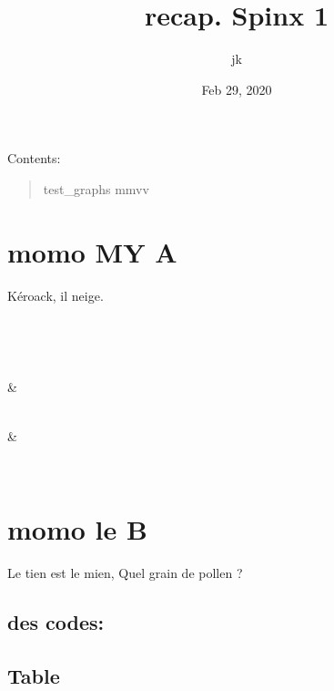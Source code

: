 \documentclass[letterpaper,10pt,english]{sphinxmanual}
\title{recap.\@{} Spinx 1}
\date{Feb 29, 2020}
\author{jk}
\begin{document}
\pagestyle{empty}
\sphinxmaketitle
\pagestyle{plain}
\sphinxtableofcontents
\pagestyle{normal}
\label{\detokenize{index::doc}}


Contents:
\begin{quote}

test\_graphs mmvv
\end{quote}


\chapter{momo MY A}
\label{\detokenize{a:momo-my-a}}\label{\detokenize{a:lien-sur-a}}\label{\detokenize{a::doc}}
Kéroack, il neige.


\begin{savenotes}\sphinxatlongtablestart\begin{longtable}[c]{}
\hline

\endfirsthead

%
{}\\
\hline

\endhead

\hline
{}\\
\endfoot

\endlastfoot

&

\\
\hline
{}
&

\\
\hline
\end{longtable}\sphinxatlongtableend\end{savenotes}


\chapter{momo le B}
\label{\detokenize{b:momo-le-b}}\label{\detokenize{b::doc}}
Le tien est le mien, Quel grain de pollen ?


\section{des codes:}
\label{\detokenize{b:des-codes}}

\section{Table}
\label{\detokenize{b:table}}
\end{document}
